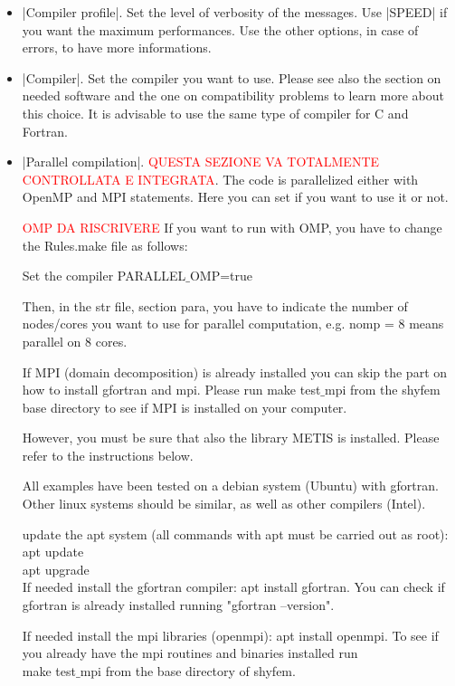 \begin{itemize}

\item |Compiler profile|. Set the level of verbosity of the messages. Use
|SPEED| if you want the maximum performances. Use the other options, in
case of errors, to have more informations.

\item |Compiler|. Set the compiler you want to use. Please see also
the section on needed software and the one on compatibility problems to
learn more about this choice. It is advisable to use the same type of
compiler for C and Fortran.


\item |Parallel compilation|. \textcolor{red}{QUESTA SEZIONE VA TOTALMENTE CONTROLLATA E INTEGRATA}. The code is parallelized either with OpenMP and MPI statements. Here you can set if you want to use it or not.

\textcolor{red}{OMP DA RISCRIVERE}
If you want to run with OMP, you have to change the Rules.make file as follows:

Set the compiler
PARALLEL$\_$OMP=true

Then, in the str file, section para, you have to indicate the number of nodes/cores you want to use for parallel computation, e.g. nomp = 8 means parallel on 8 cores.

If MPI (domain decomposition) is already installed you can skip the part on how to install
gfortran and mpi. Please run make test$\_$mpi from the shyfem base
directory to see if MPI is installed on your computer.

However, you must be sure that also the library METIS is installed. Please
refer to the instructions below.

All examples have been tested on a debian system (Ubuntu) with gfortran. Other linux systems
should be similar, as well as other compilers (Intel).

update the apt system (all commands with apt must be carried out as root): \\
	apt update\\
	apt upgrade\\

\subitem If needed install the gfortran compiler: apt install gfortran. You can check if gfortran is already installed running "gfortran --version".

\subitem If needed install the mpi libraries (openmpi): apt install openmpi. To see if you already have the mpi routines and binaries installed run\\
make test$\_$mpi from the base directory of shyfem.\\


\end{itemize}
